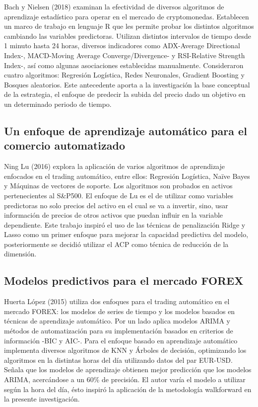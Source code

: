 \documentclass[a4paper,12pt]{Latex/Classes/PhDthesisPSnPDF}
\begin{document}
Bach y Nielsen (2018) examinan la efectividad de diversos algoritmos de aprendizaje estadístico para operar en el mercado de cryptomonedas. Establecen un marco de trabajo en lenguaje R que les permite probar los distintos algoritmos cambiando las variables predictoras. Utilizan distintos intervalos de tiempo desde 1 minuto hasta 24 horas, diversos indicadores como ADX-Average Directional Index-, MACD-Moving Average Converge/Divergence- y RSI-Relative Strength Index-, así como algunas asociaciones establecidas manualmente. Consideraron cuatro algoritmos: Regresión Logística, Redes Neuronales, Gradient Boosting y Bosques aleatorios. Este antecedente aporta a la investigación la base conceptual de la estrategia, el enfoque de predecir la subida del precio dado un objetivo en un determinado periodo de tiempo.

\subsection{Un enfoque de aprendizaje automático para el comercio automatizado}

Ning Lu (2016) explora la aplicación de varios algoritmos de aprendizaje enfocados en el trading automático, entre ellos: Regresión Logística, Naïve Bayes y Máquinas de vectores de soporte. Los algoritmos son probados en activos pertenecientes al S\&P500. El enfoque de Lu es el de utilizar como variables predictoras no solo precios del activo en el cual se va a invertir, sino, usar información de precios de otros activos que puedan influir en la variable dependiente. Este trabajo inspiró el uso de las técnicas de penalización Ridge y Lasso como un primer enfoque para mejorar la capacidad predictiva del modelo, posteriormente se decidió utilizar el ACP como técnica de reducción de la dimensión.

\subsection{Modelos predictivos para el mercado FOREX}

Huerta López (2015) utiliza dos enfoques para el trading automático en el mercado FOREX: los modelos de series de tiempo y los modelos basados en técnicas de aprendizaje automático. Por un lado aplica modelos ARIMA y métodos de automatización para su implementación basados en criterios de información -BIC y AIC-. Para el enfoque basado en aprendizaje automático implementa diversos algoritmos de KNN y Árboles de decisión, optimizando los algoritmos en la distintas horas del día utilizando datos del par EUR-USD. Señala que los modelos de aprendizaje obtienen mejor predicción que los modelos ARIMA, acercándose a un 60\% de precisión. El autor varía el modelo a utilizar según la hora del día, ésto inspiró la aplicación de la metodología walkforward en la presente investigación.
\end{document}
